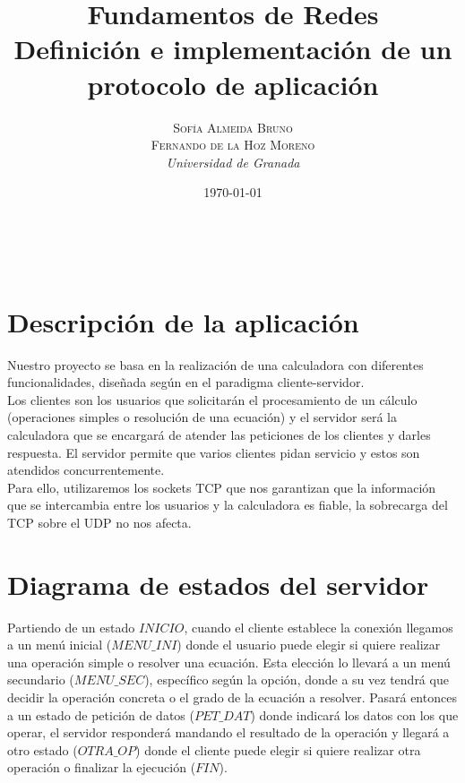 \documentclass[a4paper, 11pt]{article}
\title{\textbf{Fundamentos de Redes}\\ %
Definición e implementación de un protocolo de aplicación} %
\author{\textsc{Sofía Almeida Bruno\\Fernando de la Hoz Moreno} %
\\{\textit{Universidad de Granada}}} %
\date{\today} %
\makeatletter
\theoremstyle{plain}
\renewcommand{\maketitle}{
  \begin{flushright} %
  
  {\LARGE\@title} %
  
  \vspace{50pt} %
  
  {\large\@author} %
  \\\@date %
  \vspace{40pt} %
  \end{flushright}
}
\makeatother
\begin{document}
\maketitle %
\section{Descripción de la aplicación}
Nuestro proyecto se basa en la realización de una calculadora con diferentes funcionalidades, diseñada según en el paradigma cliente-servidor.\\
Los clientes son los usuarios que solicitarán el procesamiento de un cálculo (operaciones simples o resolución de una ecuación) y el servidor será la calculadora que se encargará de atender las peticiones de los clientes y darles respuesta. El servidor permite que varios clientes pidan servicio y estos son atendidos concurrentemente.\\
Para ello, utilizaremos los sockets TCP que nos garantizan que la información que se intercambia entre los usuarios y la calculadora es fiable, la sobrecarga del TCP sobre el UDP no nos afecta.

\section{Diagrama de estados del servidor}

Partiendo de un estado $INICIO$, cuando el cliente establece la conexión llegamos a un menú inicial ($MENU\_INI$) donde el usuario puede elegir si quiere realizar una operación simple o resolver una ecuación. Esta elección lo llevará a un menú secundario ($MENU\_SEC$), específico según la opción, donde a su vez tendrá que decidir la operación concreta o el grado de la ecuación a resolver. Pasará entonces a un estado de petición de datos ($PET\_DAT$) donde indicará los datos con los que operar, el servidor responderá mandando el resultado de la operación y llegará a otro estado ($OTRA\_OP$) donde el cliente puede elegir si quiere realizar otra operación o finalizar la ejecución ($FIN$). 
\end{document}
